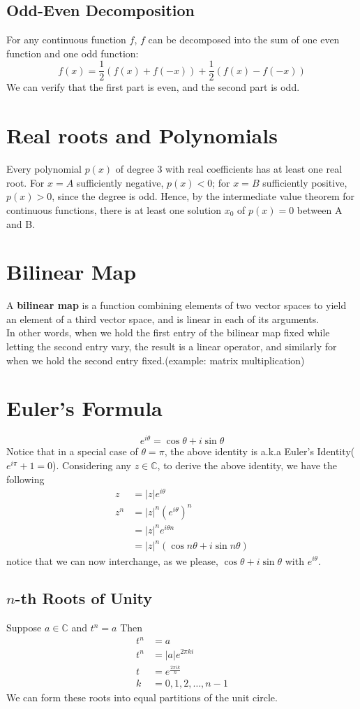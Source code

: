 \documentclass[11pt]{article}
\newcommand{\tb}[1]{\textbf{#1}}
\newcommand{\mc}[0]{\mathbb{C}}
\begin{document}
\subsection{Odd-Even Decomposition}
For any continuous function $f$, $f$ can be decomposed into the sum of one even function and one odd function:
$$f(x) = \frac{1}{2}(f(x) + f(-x)) + \frac{1}{2}(f(x) - f(-x))$$
We can verify that the first part is even, and the second part is odd.
\section{Real roots and Polynomials}
Every polynomial $p(x)$ of degree 3 with real coefficients has at least one real root. For $x = A$ sufficiently negative, $p(x) < 0$; for $x = B$ sufficiently positive, $p(x) > 0$, since the degree is odd. Hence, by the intermediate value theorem for continuous functions, there is at least one solution $x_0$ of $p(x) = 0$ between A and B.
\section{Bilinear Map}
A \tb{bilinear map} is a function combining elements of two vector spaces to yield an element of a third vector space, and is linear in each of its arguments. \\
In other words, when we hold the first entry of the bilinear map fixed while letting the second entry vary, the result is a linear operator, and similarly for when we hold the second entry fixed.(example: matrix multiplication)
\section{Euler's Formula}
$$e^{i\theta} = \cos \theta + i\sin \theta$$
    Notice that in a special case of $\theta = \pi$, the above identity is a.k.a Euler's 
    Identity($e^{i\pi}+1=0$). Considering any $z\in \mc$, to derive the above identity, we have the following
    \begin{align*}
    	z &= |z|e^{i\theta}\\
        z^n &= |z|^n\left(e^{i\theta}\right)^n\\
        &= |z|^ne^{i\theta n} \\
        &= |z|^n\left(\cos n\theta + i\sin n \theta\right)
    \end{align*}
    notice that we can now interchange, as we please, $\cos \theta + i\sin \theta$ with $e^{i\theta}$.
\subsection{$n$-th Roots of Unity}
Suppose $a \in \mc$ and $t^n = a$
Then 
\begin{align*}
	t^n &= a\\
	t^n &= |a|e^{2\pi ki}\\
	t &= e^\frac{2\pi ik}{n}\\
	k &= 0, 1, 2, \hdots, n-1
\end{align*}
We can form these roots into equal partitions of the unit circle.
\end{document}
